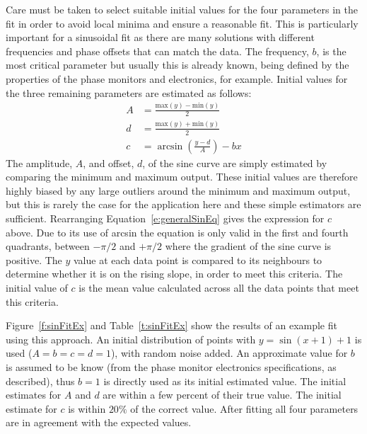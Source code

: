 Care must be taken to select suitable initial values for the four parameters in the fit in order to avoid local minima and ensure a reasonable fit. This is particularly important for a sinusoidal fit as there are many solutions with different frequencies and phase offsets that can match the data. The frequency, \(b\), is the most critical parameter but usually this is already known, being defined by the properties of the phase monitors and electronics, for example. Initial values for the three remaining parameters are estimated as follows:
\begin{align}
A &= \frac{\mathrm{max}(y)-\mathrm{min}(y)}{2} \\
d &= \frac{\mathrm{max}(y)+\mathrm{min}(y)}{2} \\
c &= \arcsin\left(\frac{y-d}{A}\right) - bx
\end{align}
The amplitude, \(A\), and offset, \(d\), of the sine curve are simply estimated by comparing the minimum and maximum output. These initial values are therefore highly biased by any large outliers around the minimum and maximum output, but this is rarely the case for the application here and these simple estimators are sufficient.
Rearranging Equation~\ref{e:generalSinEq} gives the expression for \(c\) above. Due to its use of arcsin the equation is only valid in the first and fourth quadrants, between \(-\pi/2\) and \(+\pi/2\) where the gradient of the sine curve is positive. The \(y\) value at each data point is compared to its neighbours to determine whether it is on the rising slope, in order to meet this criteria. The initial value of \(c\) is the mean value calculated across all the data points that meet this criteria.

Figure~\ref{f:sinFitEx} and Table~\ref{t:sinFitEx} show the results of an example fit using this approach. An initial distribution of points with \(y=\sin(x+1)+1\) is used (\(A = b = c = d = 1\)), with random noise added. An approximate value for \(b\) is assumed to be know (from the phase monitor electronics specifications, as described), thus \(b=1\) is directly used as its initial estimated value. The initial estimates for \(A\) and \(d\) are within a few percent of their true value. The initial estimate for \(c\) is within \(20\%\) of the correct value. After fitting all four parameters are in agreement with the expected values.

